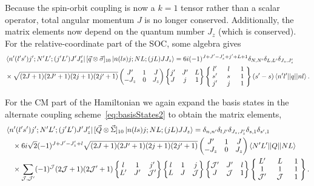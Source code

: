 \documentclass[%
 onecolumn,
 notitlepage,
 amsmath,amssymb,
 aps,
]{revtex4-1}
\newcommand{\threej}[6]{ \begin{pmatrix}
  #1 & #2 & #3 \\
  #4 & #5 & #6 
 \end{pmatrix}}
\newcommand{\sixj}[6]{ \begin{Bmatrix}
  #1 & #2 & #3 \\
  #4 & #5 & #6 
 \end{Bmatrix}}
\newcommand{\ninej}[9]{ \begin{Bmatrix}
  #1 & #2 & #3 \\
  #4 & #5 & #6 \\
  #7 & #8 & #9
 \end{Bmatrix}}
\begin{document}
Because the spin-orbit coupling is now a $k=1$ tensor rather than a scalar operator, total angular momentum $J$ is no longer conserved. Additionally, the matrix elements now depend on the quantum number $J_z$ (which is conserved). For the relative-coordinate part of the SOC, some algebra gives
\begin{equation}\begin{split}
&\bra{n'(l's')j';N'L';(j'L')J'J'_z}  [ \vec{q} \otimes \vec{\sigma} ]_{10}  \ket{n(ls)j;NL;(jL)JJ_z} =6 i (-1)^{J+J'-J'_z+j'+L+1}\delta_{N,N'}\delta_{L,L'}\delta_{J_z,J'_z} \\
 &\times\sqrt{(2J+1)(2J'+1)(2j+1)(2j'+1)} \threej{J'}{1}{J}{-J_z}{0}{J_z} \sixj{j'}{J'}{L}{J}{j}{1}
 \renewcommand{\arraystretch}{0.9}
 \ninej{\hphantom{l}l'\hphantom{l}}{\hphantom{l}l\hphantom{l}}{\hphantom{l}1\hphantom{l}}{s'}{s}{1}{j'}{j}{1} (s'-s) \braket{n'l' || q || n l}.
\end{split}
\end{equation}

For the CM part of the Hamiltonian we again expand the basis states in the alternate coupling scheme~\eqref{eq:basisStates2} to obtain the matrix elements,
\begin{equation}\begin{split}
&\bra{n'(l's')j';N'L';(j'L')J'J'_z} [ \vec{Q} \otimes \vec{\Sigma} ]_{10}  \ket{n(ls)j;NL;(jL)JJ_z} = \delta_{n,n'}\delta_{l,l'}\delta_{J_z,J'_z}\delta_{s,1}\delta_{s',1} \\
 &\quad\times 6 i \sqrt{2}(-1)^{J+J'-J'_z+l} \sqrt{(2J+1)(2J'+1)(2j+1)(2j'+1)} \threej{J'}{1}{J}{-J_z}{0}{J_z}  \braket{N' L' || Q || N L} \\ 
 &\quad\times\sum_{\mathcal{J},\mathcal{J}'} (-1)^\mathcal{J}(2\mathcal{J}+1)(2\mathcal{J}'+1)\sixj{l}{1}{j'}{L'}{J'}{\mathcal{J}'}\sixj{l}{1}{j}{L}{J}{\mathcal{J}}\sixj{\mathcal{J}'}{J'}{l}{J}{\mathcal{J}}{1}
 \renewcommand{\arraystretch}{0.9}
 \ninej{\hphantom{l}L'\hphantom{l}}{\hphantom{l}L\hphantom{l}}{\hphantom{l}1\hphantom{l}}{1}{1}{1}{\mathcal{J}'}{\mathcal{J}}{1} .
\end{split}
\end{equation}
\end{document}
